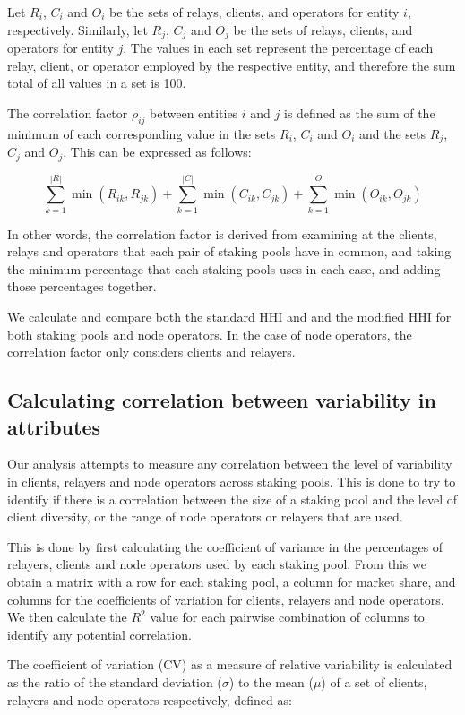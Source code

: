 \documentclass[conference]{IEEEtran}
\begin{document}
Let $R_i$, $C_i$ and $O_i$ be the sets of relays, clients, and operators for entity $i$, respectively. Similarly, let $R_j$, $C_j$ and $O_j$ be the sets of relays, clients, and operators for entity $j$.  The values in each set represent the percentage of each relay, client, or operator employed by the respective entity, and therefore the sum total of all values in a set is 100.

The correlation factor $\rho_{ij}$ between entities $i$ and $j$ is defined as the sum of the minimum of each corresponding value in the sets $R_i$, $C_i$ and $O_i$ and the sets $R_j$, $C_j$ and $O_j$. This can be expressed as follows:

\[
\sum_{k=1}^{|R|} \min(R_{ik}, R_{jk}) + \sum_{k=1}^{|C|} \min(C_{ik}, C_{jk}) + \sum_{k=1}^{|O|} \min(O_{ik}, O_{jk})
\]

In other words, the correlation factor is derived from examining at the clients, relays and operators that each pair of staking pools have in common, and taking the minimum percentage that each staking pools uses in each case, and adding those percentages together.

We calculate and compare both the standard HHI and and the modified HHI for both staking pools and node operators.  In the case of node operators, the correlation factor only considers clients and relayers.

\subsection{Calculating correlation between variability in attributes}

Our analysis attempts to measure any correlation between the level of variability in clients, relayers and node operators across staking pools. This is done to try to identify if there is a correlation between the size of a staking pool and the level of client diversity, or the range of node operators or relayers that are used.

This is done by first calculating the coefficient of variance in the percentages of relayers, clients and node operators used by each staking pool. From this we obtain a matrix with a row for each staking pool, a column for market share, and columns for the coefficients of variation for clients, relayers and node operators.  We then calculate the $R^2$ value for each pairwise combination of columns to identify any potential correlation.

The coefficient of variation (CV) as a measure of relative variability is calculated as the ratio of the standard deviation ($\sigma$) to the mean ($\mu$) of a set of clients, relayers and node operators respectively, defined as:
\end{document}
